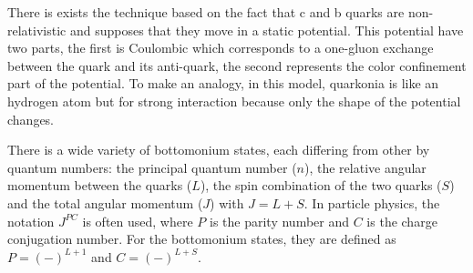 There is exists the technique based on the fact that c and b quarks are non-
relativistic and supposes that they move in a static
potential\cite{Kulshreshtha:1984mw,Parmar:2010ii,shah}. This potential have two
parts, the first is Coulombic which corresponds to a one-gluon exchange between
the quark and its anti-quark, the second represents the color confinement part
of the potential. To make an analogy, in this model, quarkonia is like an
hydrogen atom but for strong interaction because only the shape of the
potential changes.

There is a wide variety of bottomonium states, each differing from other by quantum
numbers: the principal quantum number ($n$), the relative angular momentum
between the quarks ($L$), the spin combination of the two quarks ($S$) and the total
angular momentum ($J$) with $J = L + S$. In particle physics, the notation $J^{PC}$ is
often used, where $P$ is the parity number and $C$ is the charge conjugation number.
For the bottomonium states, they are defined as $P=(-)^{L+1}$ and $C=(-)^{L+S}$.


